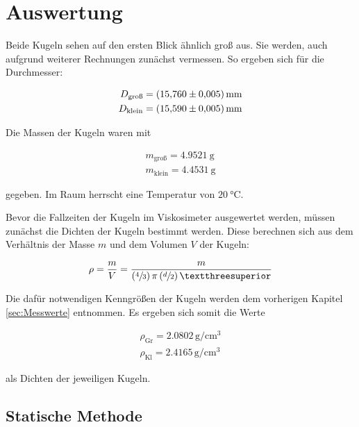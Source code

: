 %

%
\section{Auswertung}
\label{sec:Auswertung}

Beide Kugeln sehen auf den ersten Blick ähnlich groß aus. Sie werden, auch aufgrund weiterer Rechnungen zunächst 
vermessen. So ergeben sich für die Durchmesser:

\begin{align}
\label{eqn:Kugeldurchmesser}
    D_\text{groß} = \qty{15.760 +- 0.005}{\milli \meter} \\
    D_\text{klein} = \qty{15.590 +- 0.005}{\milli \meter}
\end{align}

\noindent
Die Massen der Kugeln waren mit

\begin{align}
\label{eqn:Kugelgewichte}
    m_\text{groß} = \qty{4.9521}{\gram} \\
    m_\text{klein} = \qty{4.4531}{\gram}
\end{align}

\noindent
gegeben.
Im Raum herrscht eine Temperatur von $\qty{20}{\celsius}$. 

\noindent Bevor die Fallzeiten der Kugeln im Viskosimeter ausgewertet werden, müssen zunächst die Dichten der Kugeln 
bestimmt werden. Diese berechnen sich aus dem Verhältnis der Masse $m$ und dem Volumen $V$ der Kugeln:

\begin{equation*}
    \rho = \frac{m}{V} = \frac{m}{\left(\sfrac{4}{3}\right)\pi\left(\sfrac{d}{2}\right)³}
\end{equation*}

\noindent Die dafür notwendigen Kenngrößen der Kugeln werden dem vorherigen Kapitel \ref{sec:Messwerte} entnommen. Es 
ergeben sich somit die Werte

\begin{gather*}
    \rho_\text{Gr} = 2.0802\,\unit{\gram\per\centi\cubic\meter} \\
    \rho_\text{Kl} = 2.4165\,\unit{\gram\per\centi\cubic\meter}
\end{gather*}

\noindent als Dichten der jeweiligen Kugeln.

\subsection{Statische Methode}

